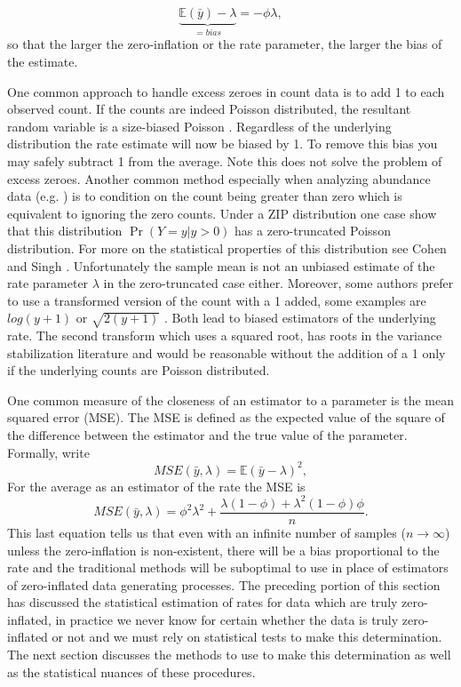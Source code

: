 \documentclass{article}
\begin{document}
\begin{equation}
\underbrace{\mathbb{E}(\bar{y}) - \lambda}_{=bias} = -\phi\lambda,
\end{equation}
so that the larger the zero-inflation or the rate parameter, the larger the bias of the estimate. 

One common approach to handle excess zeroes in count data is to add 1 to each observed count. If the counts are indeed Poisson distributed, the resultant random variable is a size-biased Poisson \cite{arratia2013size,arratia2010size}. Regardless of the underlying distribution the rate estimate will now be biased by 1. To remove this bias you may safely subtract 1 from the average. Note this does not solve the problem of excess zeroes. Another common method especially when analyzing abundance data (e.g. \cite{jagdale2013incidence}) is to condition on the count being greater than zero  which is equivalent to ignoring the zero counts. Under a ZIP distribution one case show that this distribution $\Pr(Y=y \vert y>0)$ has a zero-truncated Poisson distribution. For more on the statistical properties of this distribution see Cohen \cite{cohen1960estimating} and Singh \cite{singh1978characterization}. Unfortunately the sample mean is not an unbiased estimate of the rate parameter $\lambda$ in the zero-truncated case either. Moreover, some authors prefer to use a transformed version of the count with a 1 added, some examples are $log(y+1)$ \cite{howland2014spatial,centinari2016root} or $\sqrt{2(y+1)}$ \cite{anscombe1948transformation,yu2009variance}. Both lead to biased estimators of the underlying rate. The second transform which uses a squared root, has roots in the variance stabilization literature \cite{freeman1950transformations} and would be reasonable without the addition of a 1 only if the underlying counts are Poisson distributed.  

One common measure of the closeness of an estimator to a parameter is the mean squared error (MSE). The MSE is defined as the expected value of the square of the difference between the estimator and the true value of the parameter. Formally, write 
\begin{equation}
MSE(\bar{y}, \lambda) = \mathbb{E}(\bar{y}-\lambda)^2,
\end{equation}
For the average as an estimator of the rate the MSE is 
\begin{equation}
MSE(\bar{y}, \lambda) = \phi^2\lambda^2 + \frac{ \lambda(1-\phi) +\lambda^2(1-\phi)\phi}{n}.
\end{equation}
This last equation tells us that even with an infinite number of samples ($n \to \infty$) unless the zero-inflation is non-existent, there will be a bias proportional to the rate and the traditional methods will be suboptimal to use in place of estimators of zero-inflated data generating processes. The preceding portion of this section has discussed the statistical estimation of rates for data which are truly zero-inflated, in practice we never know for certain whether the data is truly zero-inflated or not and we must rely on statistical tests to make this determination. The next section discusses the methods to use to make this determination as well as the statistical nuances of these procedures.
 
\end{document}
